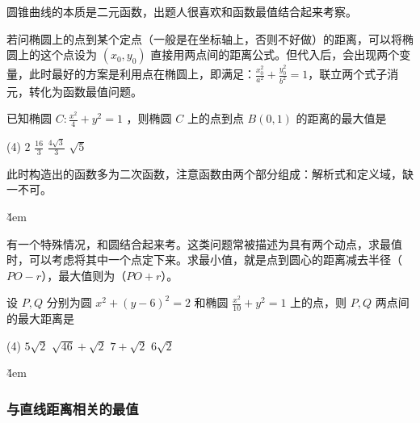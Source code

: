 圆锥曲线的本质是二元函数，出题人很喜欢和函数最值结合起来考察。

\vspace{2em}

\begin{tips}
    若问椭圆上的点到某个定点（一般是在坐标轴上，否则不好做）的距离，可以将椭圆上的这个点设为 $(x_0,y_0)$ 直接用两点间的距离公式。但代入后，会出现两个变量，此时最好的方案是利用点在椭圆上，即满足：$\frac{x_0^{2}}{a^2}+\frac{y_0^{2}}{b^2}=1$，联立两个式子消元，转化为函数最值问题。
\end{tips}

\begin{example}
    已知椭圆 $C: \frac{x^{2}}{4}+y^{2}=1$ ，则椭圆 $C$ 上的点到点 $B(0,1)$ 的距离的最大值是
    \begin{tasks}(4)
        \task $2$
        \task $\frac{16}{3}$
        \task $\frac{4 \sqrt{3}}{3}$
        \task $\sqrt{5}$
    \end{tasks}
\end{example}

\begin{tips}
    此时构造出的函数多为二次函数，注意函数由两个部分组成：解析式和定义域，缺一不可。
\end{tips}

\begin{solution}

\end{solution}

\v{4em}

\begin{theorem}[定一动一]
    有一个特殊情况，和圆结合起来考。这类问题常被描述为具有两个动点，求最值时，可以考虑将其中一个点定下来。求最小值，就是点到圆心的距离减去半径（$PO-r$），最大值则为（$PO+r$）。
\end{theorem}

\begin{example}
    设 $P, Q$ 分别为圆 $x^{2}+(y-6)^{2}=2$ 和椭圆 $\frac{x^{2}}{10}+y^{2}=1$ 上的点，则 $P, Q$ 两点间的最大距离是
    \begin{tasks}(4)
        \task $5 \sqrt{2}$
        \task $\sqrt{46}+\sqrt{2}$
        \task $7+\sqrt{2}$
        \task $6 \sqrt{2}$
    \end{tasks}
\end{example}

\v{4em}

\subsubsection{与直线距离相关的最值}

